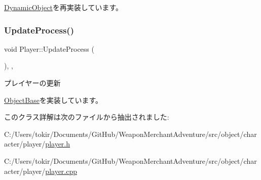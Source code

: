 \mbox{\hyperlink{class_dynamic_object_aa7488e1b4dfd7049447535d93d9d6783}{Dynamic\+Object}}を再実装しています。

\mbox{\label{class_player_ab8accc9b83b030f5313f1b4872a7e634}} 
\subsubsection{\texorpdfstring{Update\+Process()}{UpdateProcess()}}
{\footnotesize\ttfamily void Player\+::\+Update\+Process (\begin{DoxyParamCaption}{ }\end{DoxyParamCaption})\hspace{0.3cm}{\ttfamily [final]}, {\ttfamily [protected]}, {\ttfamily [virtual]}}



プレイヤーの更新 



\mbox{\hyperlink{class_object_base_a8b5b72b363a419767efde0b0e692ea95}{Object\+Base}}を実装しています。



このクラス詳解は次のファイルから抽出されました\+:\begin{DoxyCompactItemize}
\item 
C\+:/\+Users/tokir/\+Documents/\+Git\+Hub/\+Weapon\+Merchant\+Adventure/src/object/character/player/\mbox{\hyperlink{player_8h}{player.\+h}}\item 
C\+:/\+Users/tokir/\+Documents/\+Git\+Hub/\+Weapon\+Merchant\+Adventure/src/object/character/player/\mbox{\hyperlink{player_8cpp}{player.\+cpp}}\end{DoxyCompactItemize}
